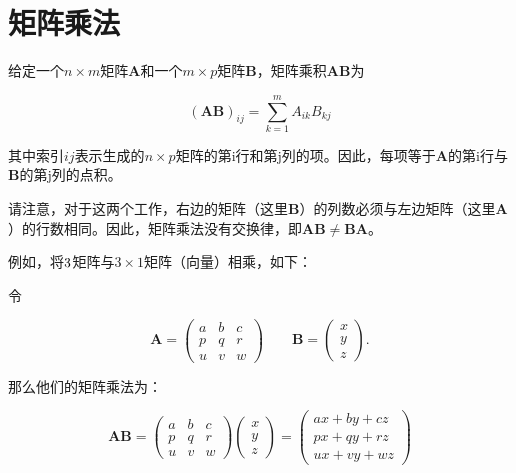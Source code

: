 \section{矩阵乘法}

给定一个$n\times m$矩阵$\mathbf{A}$和一个$m\times p$矩阵$\mathbf{B}$，矩阵乘积$\mathbf{AB}$为

\begin{equation}
(\mathbf{AB})_{ij}=\sum_{k=1}^mA_{ik}B_{kj}
\end{equation}


其中索引$ij$表示生成的$n\times p$矩阵的第i行和第j列的项。因此，每项等于$\mathbf{A}$的第i行与$\mathbf{B}$的第j列的点积。



请注意，对于这两个工作，右边的矩阵（这里$\mathbf{B}$）的列数必须与左边矩阵（这里$\mathbf{A}$）的行数相同。因此，矩阵乘法没有交换律，即$\mathbf{AB}\neq\mathbf{BA}$。

例如，将$3\time 3$矩阵与$3\times 1$矩阵（向量）相乘，如下：

令

\begin{equation}\nonumber
\mathbf{A} = \begin{pmatrix}
a & b & c \\
p & q & r \\
u & v & w
\end{pmatrix} \qquad \mathbf{B} = \begin{pmatrix}
x \\
y \\
z
\end{pmatrix}.
\end{equation}

那么他们的矩阵乘法为：

\begin{equation}\nonumber
\mathbf{AB} = \begin{pmatrix}
a & b & c \\
p & q & r \\
u & v & w
\end{pmatrix} \begin{pmatrix}
x \\
y \\
z
\end{pmatrix} =\begin{pmatrix}
ax + by + cz \\
px + qy + rz \\
ux + vy + wz
\end{pmatrix}
\end{equation}

